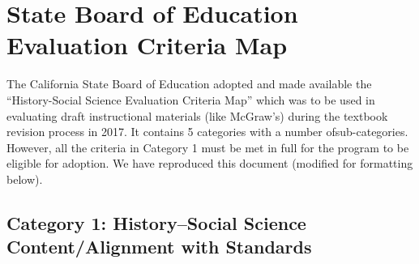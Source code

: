 \chapter{State Board of Education Evaluation Criteria Map}

The California State Board of Education adopted and made available the “History-Social Science Evaluation Criteria Map” which was to be used in evaluating draft instructional materials (like McGraw’s) during the textbook revision process in 2017. It contains 5 categories with a number of\break sub-categories. However, all the criteria in Category 1 must be met in full for the program to be eligible for adoption. We have reproduced this document (modified for formatting below).

\section*{Category 1: History–Social Science Content/Alignment with Standards} 

